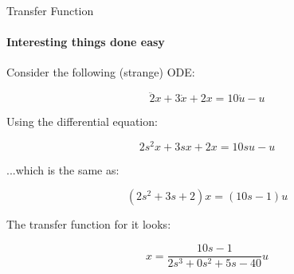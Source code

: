 \documentclass{beamer}
\begin{document}
\begin{frame}{Transfer Function}
\framesubtitle{Interesting things done easy}
\begin{flushleft}

Consider the following (strange) ODE:

\begin{equation}
\ddot 2x + 3\dot x + 2 x = 10 \dot u - u
\end{equation}

Using the differential equation:

\begin{equation}
2 s^2 x + 3s x + 2x = 10s u - u
\end{equation}

...which is the same as:

\begin{equation}
(2s^2 + 3s + 2)x = (10s - 1)u
\end{equation}

The transfer function for it looks: 

\begin{equation}
x = \frac{10s - 1}{2 s^3 + 0 s^2 + 5 s - 40} u
\end{equation}

\end{flushleft}
\end{frame}
\end{document}
